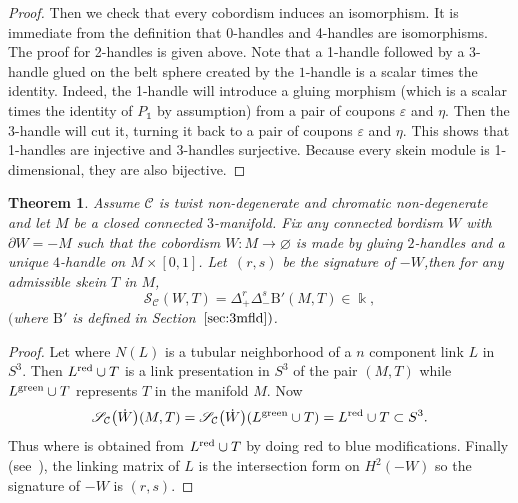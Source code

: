 \documentclass[10pt,a4paper]{amsart}
\newtheorem{theorem}{Theorem}
\numberwithin{equation}{section}
\numberwithin{theorem}{section}
\numberwithin{proposition}{section}
\numberwithin{definition}{section}
\numberwithin{lemma}{section}
\numberwithin{corollary}{section}
\numberwithin{remark}{section}
\numberwithin{example}{section}
\newcommand{\cat}{\mathcal{C}}
\newcommand{\unit}{\ensuremath{\mathds{1}}}
\newcommand{\FK}{{\Bbbk}}
\newcommand{\TSkein}{{\mathscr{S}}}
\newcommand{\ThreeManInv}{\mathrm{B}}
\begin{document}
\begin{proof}
Then we check that every cobordism induces an isomorphism. It is
 immediate from the definition that 0-handles and 4-handles are
 isomorphisms. The proof for 2-handles is given above. Note that a 1-handle
 followed by a 3-handle glued on the belt sphere created by the $1$-handle is a scalar times the identity. Indeed, the
 1-handle will introduce a gluing morphism (which is a scalar times
 the identity of $P_\unit$ by assumption) from a pair of coupons
 $\varepsilon$ and $\eta$. Then the 3-handle will cut it, turning it
 back to a pair of coupons $\varepsilon$ and $\eta$. This shows that
 1-handles are injective and 3-handles surjective. Because every
 skein module is 1-dimensional, they are also bijective.
\end{proof}

\begin{theorem}\label{T:4TQFT-3M}
 Assume $\cat$ is twist non-degenerate and chromatic non-degenerate
 and let $M$ be a closed connected $3$-manifold. Fix any connected
 bordism $W$ with $\partial W=-M$ such that the cobordism $W\colon M\to \varnothing$
 is made by gluing $2$-handles and a unique $4$-handle on ${M\times[0,1]}$.
 Let~$(r,s)$ be the signature of $-W$,then for any admissible skein
 $T$ in $M$,
 \begin{equation*}
 \TSkein_\cat(W,T)=\Delta_+^r\Delta_-^s\ThreeManInv'(M,T)\in\FK,
 \end{equation*}
 $($where $\ThreeManInv'$ is defined in Section~$\ref{sec:3mfld})$.
\end{theorem}
\begin{proof}
 Let
  where $N(L)$ is a
 tubular neighborhood of a $n$ component link $L$ in $S^3$. Then
 $L^{\rm red}\cup T$ is a link presentation in $S^3$ of the pair $(M,T)$
 while $L^{\rm green}\cup T$ represents $T$ in the manifold $M$. Now
 \[
 \TSkein_\cat\bigl(\dot W\bigr)(M,T)=\TSkein_\cat\bigl(\dot W\bigr)(L^{\rm green}\cup
 T)=L^{\rm red}\cup T\subset S^3.
 \]
 Thus
 \smash{$\TSkein_\cat(W,T)=F'\bigl(L^{\rm blue}\cup T\bigr)$} where  is
 obtained from $L^{\rm red}\cup T$ by doing red to blue modifications.
 Finally (see~\cite[Proposition 4.5.11]{GS99}), the linking
 matrix of $L$ is the intersection form on $H^2(-W)$ so the signature
 of $-W$ is $(r,s)$.
\end{proof}
\end{document}
